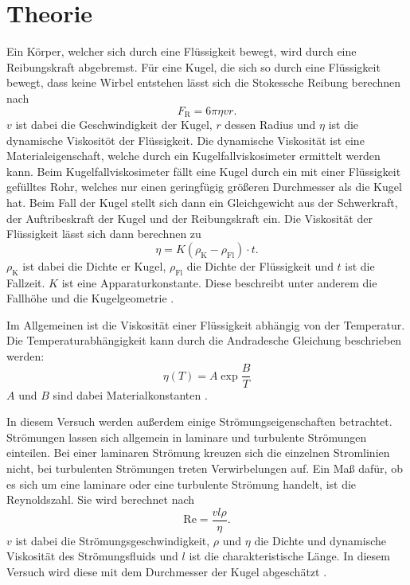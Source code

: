 \section{Theorie}
Ein Körper, welcher sich durch eine Flüssigkeit bewegt, wird durch eine Reibungskraft abgebremst. Für eine Kugel, die sich so durch eine Flüssigkeit bewegt, dass keine Wirbel 
entstehen lässt sich die Stokessche Reibung berechnen nach
\begin{equation}
    F_\text{R} = 6 \pi \eta v r .
\end{equation}
$v$ ist dabei die Geschwindigkeit der Kugel, $r$ dessen Radius und $\eta$ ist die dynamische Viskositöt der Flüssigkeit. Die dynamische Viskosität ist eine Materialeigenschaft, 
welche durch ein Kugelfallviskosimeter ermittelt werden kann. Beim Kugelfallviskosimeter fällt eine Kugel durch ein mit einer Flüssigkeit gefülltes Rohr, welches nur einen 
geringfügig größeren Durchmesser als die Kugel hat. Beim Fall der Kugel stellt sich dann ein Gleichgewicht aus der Schwerkraft, der Auftribeskraft der Kugel und der Reibungskraft 
ein. Die Viskosität der Flüssigkeit lässt sich dann berechnen zu
\begin{equation}
    \label{eq:viskositaet}
    \eta = K (\rho_\text{K} - \rho_\text{Fl}) \cdot t .
\end{equation}
$\rho_\text{K}$ ist dabei die Dichte er Kugel, $\rho_\text{Fl}$ die Dichte der Flüssigkeit und $t$ ist die Fallzeit. $K$ ist eine Apparaturkonstante. Diese beschreibt unter anderem 
die Fallhöhe und die Kugelgeometrie \cite{V207}.

\noindent Im Allgemeinen ist die Viskosität einer Flüssigkeit abhängig von der Temperatur. Die Temperaturabhängigkeit kann durch die Andradesche Gleichung beschrieben werden:
\begin{equation}
    \label{eq:andradescheGl}
    \eta (T) = A \exp{\frac{B}{T}}
\end{equation}
$A$ und $B$ sind dabei Materialkonstanten \cite{V207}.

\noindent In diesem Versuch werden außerdem einige Strömungseigenschaften betrachtet. Strömungen lassen sich allgemein in laminare und turbulente Strömungen einteilen. Bei einer 
laminaren Strömung kreuzen sich die einzelnen Stromlinien nicht, bei turbulenten Strömungen treten Verwirbelungen auf. Ein Maß dafür, ob es sich um eine laminare oder eine 
turbulente Strömung handelt, ist die Reynoldszahl. Sie wird berechnet nach
\begin{equation}
    \label{eq:reynold}
    \text{Re} = \frac{v l \rho}{\eta}.
\end{equation}
$v$ ist dabei die Strömungsgeschwindigkeit, $\rho$ und $\eta$ die Dichte und dynamische Viskosität des Strömungsfluids und $l$ ist die charakteristische Länge. In diesem Versuch
 wird diese mit dem Durchmesser der Kugel abgeschätzt \cite{viskositaet}.